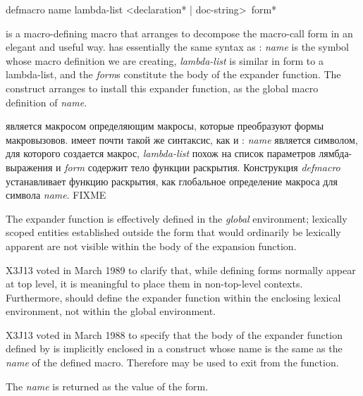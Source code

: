 \begin{defmac}
defmacro name lambda-list <{declaration}* | doc-string> {\,form}*

 is a macro-defining macro that
arranges to decompose the macro-call form in an elegant and useful way.
 has essentially the same syntax as : \emph{name} is the
symbol whose macro definition we are creating, \emph{lambda-list} is similar in
form to a lambda-list, and
the \emph{form\/}s constitute the body of the expander function.
The  construct arranges to install this expander function,
as the global macro definition of \emph{name}.

 является макросом определяющим макросы, которые преобразуют формы
макровызовов.
 имеет почти такой же синтаксис, как и :
\emph{name} является символом, для которого создается макрос,
\emph{lambda-list} похож на список параметров лямбда-выражения и 
\emph{form} содержит тело функции раскрытия.
Конструкция \emph{defmacro} устанавливает функцию раскрытия, как глобальное
определение макроса для символа \emph{name}.
FIXME

\begin{obsolete}
The expander function
is effectively defined in the \emph{global} environment;
lexically scoped entities established
outside the  form that would ordinarily be lexically apparent
are not visible within the body of the expansion function.
\end{obsolete}

\begin{newer}
X3J13 voted in March 1989 
to clarify that, while defining forms normally appear at top level,
it is meaningful to place them in non-top-level contexts.
Furthermore,  should define the expander function
within the enclosing lexical environment, not within the global
environment.
\end{newer}

\begin{newer}
X3J13 voted in March 1988 
to specify that the body of the expander function defined
by  is implicitly enclosed in a  construct
whose name is the same as the \emph{name} of the defined macro.
Therefore  may be used to exit from the function.
\end{newer}

The \emph{name} is returned
as the value of the  form.


\end{defmac}

